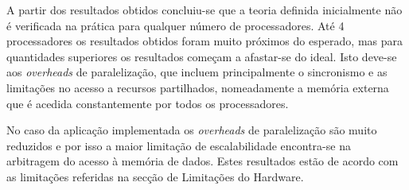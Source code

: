 A partir dos resultados obtidos concluiu-se que a teoria definida inicialmente não é verificada na prática para qualquer número de processadores. Até 4 processadores os resultados obtidos foram muito próximos do esperado, mas para quantidades superiores os resultados começam a afastar-se do ideal. Isto deve-se aos \textit{overheads} de paralelização, que incluem principalmente o sincronismo e as limitações no acesso a recursos partilhados, nomeadamente a memória externa que é acedida constantemente por todos os processadores.

No caso da aplicação implementada os \textit{overheads} de paralelização são muito reduzidos e por isso a maior limitação de escalabilidade encontra-se na arbitragem do acesso à memória de dados. Estes resultados estão de acordo com as limitações referidas na secção de Limitações do Hardware.

